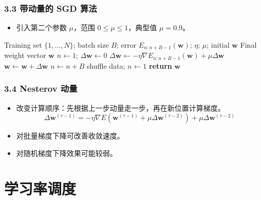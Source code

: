 \documentclass[t,aspectratio=169]{beamer} %
\begin{document}
\begin{frame}[allowframebreaks]
    \frametitle{3.3 带动量的 SGD 算法}
    \begin{itemize}
        \item 引入第二个参数 $\mu$，范围 $0 \leqslant \mu \leqslant 1$，典型值 $\mu = 0.9$。
    \end{itemize}
    \begin{algorithm}[H]
    \caption{Stochastic gradient descent with momentum}
    \begin{algorithmic}
    \Input Training set $\{1,\dots,N\}$; batch size $B$; error $E_{n:n+B-1}(\mathbf{w})$; $\eta$; $\mu$; initial $\mathbf{w}$
    \Output Final weight vector $\mathbf{w}$
    \State $n \leftarrow 1$; $\Delta\mathbf{w} \leftarrow 0$
    \Repeat
      \State $\Delta \mathbf{w} \leftarrow -\eta \nabla E_{n:n+B-1}(\mathbf{w}) + \mu\Delta \mathbf{w}$ 
      \State $\mathbf{w}\leftarrow \mathbf{w} + \Delta \mathbf{w}$ 
      \State $n \leftarrow n + B$
        \State shuffle data; $n \gets 1$
      \EndIf
    \State \textbf{return} $\mathbf{w}$
    \end{algorithmic}
    \end{algorithm}
\end{frame}

\begin{frame}
    \frametitle{3.4 Nesterov 动量}
    \begin{itemize}
        \item 改变计算顺序：先根据上一步动量走一步，再在新位置计算梯度。
        \begin{equation}
        \Delta \mathbf{w}^{(\tau-1)} = -\eta \nabla E\left(\mathbf{w}^{(\tau-1)} + \mu \Delta \mathbf{w}^{(\tau-2)}\right) + \mu \Delta \mathbf{w}^{(\tau-2)}
        \tag{7.34}
        \end{equation}
        \item 对\alert{批量梯度下降}可改善收敛速度。
        \item 对\alert{随机梯度下降}效果可能较弱。
    \end{itemize}
\end{frame}

\section{学习率调度}
\end{document}
